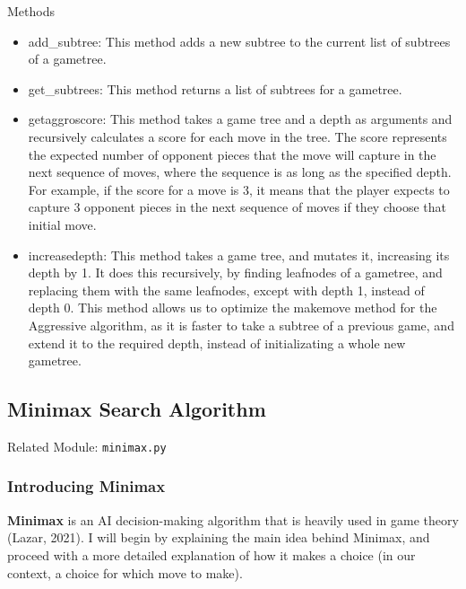 \documentclass[fontsize=11pt]{article}
\begin{document}
\begin{enumerate}
\begin{itemize}
\end{itemize}

\begin{center} Methods \end{center}
\begin{itemize}
    \item add\_subtree: This method adds a new subtree to the current list of subtrees of a gametree.

    \item get\_subtrees: This method returns a list of subtrees for a gametree. 
    
    \item getaggroscore: This method takes a game tree and a depth as arguments and recursively calculates a score for each move in the tree. The score represents the expected number of opponent pieces that the move will capture in the next sequence of moves, where the sequence is as long as the specified depth. For example, if the score for a move is 3, it means that the player expects to capture 3 opponent pieces in the next sequence of moves if they choose that initial move.

    \item increasedepth: This method takes a game tree, and mutates it, increasing its depth by 1. It does this recursively, by finding leafnodes of a gametree, and replacing them with the same leafnodes, except with depth 1, instead of depth 0. This method allows us to optimize the makemove method for the Aggressive algorithm, as it is faster to take a subtree of a previous game, and extend it to the required depth, instead of initializating a whole new gametree.
\end{itemize}
\end{enumerate}



\subsection*{Minimax Search Algorithm}
Related Module: \texttt{minimax.py}

\subsubsection*{Introducing Minimax}

\textbf{Minimax} is an AI decision-making algorithm that is heavily used in game theory (Lazar, 2021). I will begin by explaining the main idea behind Minimax, and proceed with a more detailed explanation of how it makes a choice (in our context, a choice for which move to make).
\end{document}
